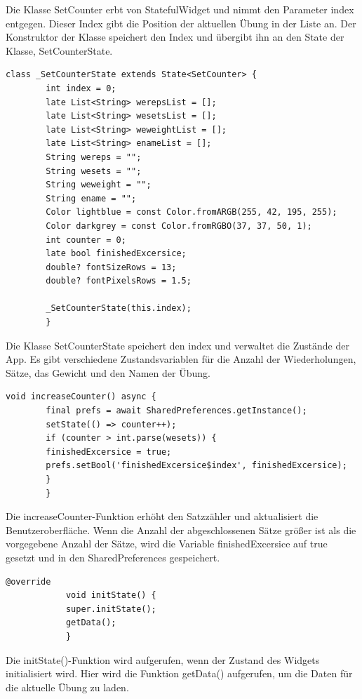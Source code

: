         Die Klasse SetCounter erbt von StatefulWidget und nimmt den Parameter index entgegen. Dieser Index gibt die Position der aktuellen Übung in der Liste an. Der Konstruktor der Klasse speichert den Index und übergibt ihn an den State der Klasse, SetCounterState.
        \\
        
        \begin{lstlisting}[caption=SetCounterState,label=lst:impl:frontend:qrcode]
        class _SetCounterState extends State<SetCounter> {
        int index = 0;
        late List<String> werepsList = [];
        late List<String> wesetsList = [];
        late List<String> weweightList = [];
        late List<String> enameList = [];
        String wereps = "";
        String wesets = "";
        String weweight = "";
        String ename = "";
        Color lightblue = const Color.fromARGB(255, 42, 195, 255);
        Color darkgrey = const Color.fromRGBO(37, 37, 50, 1);
        int counter = 0;
        late bool finishedExcersice;
        double? fontSizeRows = 13;
        double? fontPixelsRows = 1.5;
        
        _SetCounterState(this.index);
        }
        \end{lstlisting}
        
        Die Klasse SetCounterState speichert den index und verwaltet die Zustände der App. Es gibt verschiedene Zustandsvariablen für die Anzahl der Wiederholungen, Sätze, das Gewicht und den Namen der Übung. 
        \\
        
        
        \begin{lstlisting}[caption=Increase Counter Funktion,label=lst:impl:frontend:qrcode]
        void increaseCounter() async {
        final prefs = await SharedPreferences.getInstance();
        setState(() => counter++);
        if (counter > int.parse(wesets)) {
        finishedExcersice = true;
        prefs.setBool('finishedExcersice$index', finishedExcersice);
        }
        }
        \end{lstlisting}

        Die increaseCounter-Funktion erhöht den Satzzähler und aktualisiert die Benutzeroberfläche. Wenn die Anzahl der abgeschlossenen Sätze größer ist als die vorgegebene Anzahl der Sätze, wird die Variable finishedExcersice auf true gesetzt und in den SharedPreferences gespeichert.
        \\

        \begin{lstlisting}[caption=initState,label=lst:impl:frontend:qrcode]
            @override
            void initState() {
            super.initState();
            getData();
            }
            \end{lstlisting}
            \pagebreak
            Die initState()-Funktion wird aufgerufen, wenn der Zustand des Widgets initialisiert wird. Hier wird die Funktion getData() aufgerufen, um die Daten für die aktuelle Übung zu laden.
            \\
            
